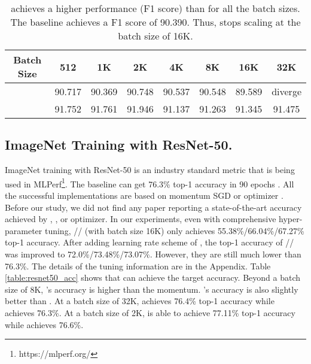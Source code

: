 \documentclass{article} \usepackage{iclr2020_conference,times}
\begin{document}
\begin{table}[ht]
\renewcommand{\arraystretch}{1.3}
\caption{  achieves a higher performance (F1 score) than  for all the batch sizes. The baseline achieves a F1 score of 90.390. Thus,  stops scaling at the batch size of 16K.}
\centering

\begin{tabular}{|c|c|c|c|c|c|c|c|}
\hline
Batch Size & 512 & 1K & 2K & 4K & 8K & 16K & 32K\\
\hline
\hline
 & 90.717 & 90.369 & 90.748 & 90.537 & 90.548 & 89.589 & diverge \\
\hline
 & 91.752 & 91.761 & 91.946 & 91.137 & 91.263 & 91.345 & 91.475 \\
\hline
\end{tabular}
\label{table:lars_lamb_bert}
\end{table}

\subsection{ImageNet Training with ResNet-50.}
ImageNet training with ResNet-50 is an industry standard metric that is being used in MLPerf\footnote{https://mlperf.org/}. 
The baseline can get 76.3\% top-1 accuracy in 90 epochs \citep{goyal2017accurate}.
All the successful implementations are based on momentum SGD \citep{he2016deep, goyal2017accurate} or  optimizer \citep{ying2018image, jia2018highly, mikami2018imagenet, you2018imagenet,yamazaki2019yet}.
Before our study, we did not find any paper reporting a state-of-the-art accuracy achieved by , , or  optimizer.
In our experiments, even with comprehensive hyper-parameter tuning, // (with batch size 16K) only achieves 55.38\%/66.04\%/67.27\% top-1 accuracy.
After adding learning rate scheme of \cite{goyal2017accurate},
the top-1 accuracy of // was improved to 72.0\%/73.48\%/73.07\%.
However, they are still much lower than 76.3\%.
The details of the tuning information are in the Appendix.
Table \ref{table:resnet50_acc} shows that  can achieve the target accuracy.
Beyond a batch size of 8K, 's accuracy is higher than the momentum.
's accuracy is also slightly better than .
At a batch size of 32K,  achieves 76.4\% top-1 accuracy while  achieves 76.3\%.
At a batch size of 2K,  is able to achieve 77.11\% top-1 accuracy while  achieves 76.6\%.

\iffalse
\begin{figure*}[tb]
\vspace{5pt}
\centering
\texttt{[image: figs/imagenet\_resnet50.png]}
\caption{ is able to achieve state-of-the-art accuracy in ImageNet/ResNet-50 training for large-batch training. The performance of momentum solver was reported by \citep{goyal2017accurate}.  means adding the learning rate scheme of \cite{goyal2017accurate} to : (1) 5-epoch warmup to stablize the initial stage; and (2) multiply the learning rate by 0.1 at 30th, 60th, and 80th epoch. The target accuracy is around 0.763 \citep{goyal2017accurate}. All the adaptive solvers were comprehensively tuned. The tuning information was in the appendix of this paper.}
\label{fig:resnet50_acc}
\vspace{-10pt}
\end{figure*}
\fi
\end{document}
